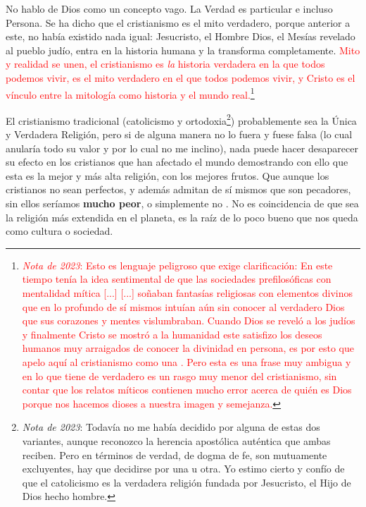 \documentclass[12pt]{article}
\begin{document}
	No hablo de Dios como un concepto vago. La Verdad es particular e
	incluso Persona. Se ha dicho que el cristianismo es el mito verdadero,
	porque anterior a este, no había existido nada igual: Jesucristo, el
	Hombre Dios, el Mesías revelado al pueblo judío, entra en la historia
	humana y la transforma completamente. \textcolor{red}{Mito y realidad se
	unen, el cristianismo es \textit{la} historia verdadera en la que todos
	podemos vivir, es el mito verdadero en el que todos podemos vivir, y
	Cristo es el vínculo entre la mitología como historia
	 y el mundo real.}\footnote{\textcolor{red}{
		\textit{Nota de 2023}:
	Esto es lenguaje peligroso que exige clarificación: En este tiempo tenía
	la
	idea sentimental de que las sociedades prefilosóficas con mentalidad
	mítica [...]\newline} \textcolor{red}{[...] soñaban fantasías religiosas
	con elementos
	divinos que en lo profundo de sí mismos intuían aún sin conocer al
	verdadero Dios que sus corazones y mentes vislumbraban. Cuando Dios se
	reveló a los judíos y finalmente Cristo se mostró a la humanidad este
	satisfizo los deseos humanos muy arraigados de conocer la divinidad en
	persona, es por esto que apelo aquí al cristianismo como una
	. Pero esta
	es una frase
	muy ambigua y en lo que tiene de verdadero es un rasgo muy menor del
	cristianismo, sin contar que los relatos míticos contienen mucho error
	acerca de quién es Dios porque nos hacemos dioses a nuestra imagen y
	semejanza.}}
	
	El cristianismo tradicional (catolicismo y
	ortodoxia\footnote{\textit{Nota de 2023}: Todavía no me había decidido
	por alguna de estas dos variantes, aunque reconozco la herencia
	apostólica auténtica que ambas reciben. Pero en términos de verdad, de
	dogma de fe, son mutuamente excluyentes, hay que decidirse por una
	u otra. Yo estimo cierto y confío de que el catolicismo es la
	verdadera religión fundada por Jesucristo, el Hijo de Dios hecho
	hombre.}) probablemente sea
	la Única y Verdadera Religión, pero si de alguna manera no lo fuera y
	fuese falsa (lo cual anularía todo su valor y por lo cual no me
	inclino), nada puede hacer desaparecer su efecto en los cristianos que
	han afectado el mundo demostrando con ello que esta es la mejor y más
	alta religión, con los mejores frutos. Que aunque los cristianos no sean
	perfectos, y además admitan de sí mismos que son pecadores, sin ellos
	seríamos \textbf{mucho peor}, o simplemente no . No
	es coincidencia de que sea la religión más extendida en el planeta, es
	la raíz de lo poco bueno que nos queda como cultura o sociedad.
\end{document}

